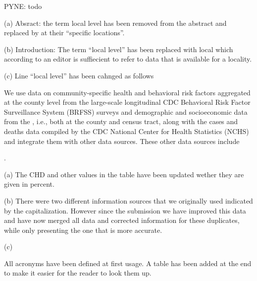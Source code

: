   {PYNE: todo

  (a) Absract: the term local level has been removed from the abstract and
  replaced by at their ``specific locations''.

  (b) Introduction: The term ``local level'' has been replaced with local which
  according to an editor is suffiecient to refer to data that is
  available for a locality.

  (c) Line   ``local level'' has been cahnged as follows
  
We use data on community-specific health and behavioral risk factors
aggregated at the county level from the large-scale longitudinal CDC
Behavioral Risk Factor Surveillance System (BRFSS) surveys
\citep{www-cdc-brfss} and demographic and socioeconomic data from the
\citet{www-sensus}, i.e., both at the county and
census tract, along with the cases and deaths data compiled by
the CDC National Center for Health Statistics (NCHS)
\citep{www-cdc-nchs} and integrate them with other data sources. These
other data sources include

.

}

%
{ (a) The CHD and other values in the table have been updated wether
  they are given in percent.

  (b) There were two different information sources that we originally
  used indicated by the capitalization. However since the submission
  we have improved this data and have now merged all data and
  corrected information for these duplicates, while only presenting
  the one that is more accurate.

  (c) 

}



{All acronyms have been defined at first usage. A table has been added
  at the end to make it easier for the reader to look them up.}



